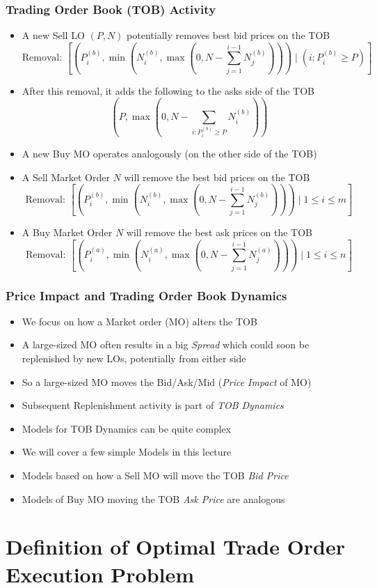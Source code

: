 \documentclass[handout]{beamer}
\begin{document}
\begin{frame}
\frametitle{Trading Order Book (TOB) Activity}
\pause
\begin{itemize}[<+->]
\item A new Sell LO $(P,N)$ potentially removes best bid prices on the TOB
$$\mbox{Removal: } [(P_i^{(b)}, \min(N_i^{(b)}, \max(0, N - \sum_{j=1}^{i-1} N_j^{(b)}))) \mid (i: P_i^{(b)} \geq P)]$$
\item After this removal, it adds the following to the asks side of the TOB 
$$(P, \max(0, N - \sum_{i: P_i^{(b)} \geq P}  N_i^{(b)}))$$
\item A new Buy MO operates analogously (on the other side of the TOB)
\item A Sell Market Order $N$ will remove the best bid prices on the TOB
$$\mbox{Removal: } [(P_i^{(b)}, \min(N_i^{(b)}, \max(0, N - \sum_{j=1}^{i-1} N_j^{(b)}))) \mid 1 \leq i \leq m]$$
\item A Buy Market Order $N$ will remove the best ask prices on the TOB
$$\mbox{Removal: } [(P_i^{(a)}, \min(N_i^{(a)}, \max(0, N - \sum_{j=1}^{i-1} N_j^{(a)}))) \mid 1 \leq i \leq n]$$
\end{itemize}
\end{frame}

\begin{frame}
\frametitle{Price Impact and Trading Order Book Dynamics}
\pause
\begin{itemize}[<+->]
\item We focus on how a Market order (MO) alters the TOB
\item A large-sized MO often results in a big {\em Spread} which could soon be replenished by new LOs, potentially from either side
\item So a large-sized MO moves the Bid/Ask/Mid ({\em Price Impact} of MO)
\item Subsequent Replenishment activity is part of {\em TOB Dynamics}
\item Models for TOB Dynamics can be quite complex
\item We will cover a few simple Models in this lecture
\item Models based on how a Sell MO will move the TOB {\em Bid Price}
\item Models of Buy MO moving the TOB {\em Ask Price} are analogous
\end{itemize}
\end{frame}

\section{Definition of Optimal Trade Order Execution Problem}
\end{document}
